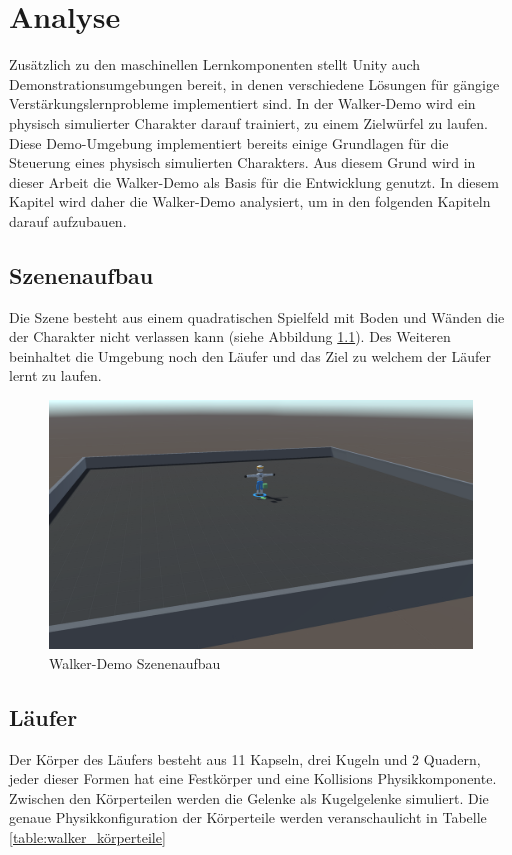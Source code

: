 {\chapter{Analyse}}
\label{sec:analyse}
Zusätzlich zu den maschinellen Lernkomponenten stellt Unity auch Demonstrationsumgebungen bereit, in denen verschiedene Lösungen für gängige Verstärkungslernprobleme implementiert sind. In der Walker-Demo wird ein physisch simulierter Charakter darauf trainiert, zu einem Zielwürfel zu laufen. Diese Demo-Umgebung implementiert bereits einige Grundlagen für die Steuerung eines physisch simulierten Charakters. Aus diesem Grund wird in dieser Arbeit die Walker-Demo als Basis für die Entwicklung genutzt. In diesem Kapitel wird daher die Walker-Demo analysiert, um in den folgenden Kapiteln darauf aufzubauen.

\section{Szenenaufbau}
Die Szene besteht aus einem quadratischen Spielfeld mit Boden und Wänden die der Charakter nicht verlassen kann (siehe Abbildung \ref{fig:walker_aufbau}). Des Weiteren beinhaltet die Umgebung noch den Läufer und das Ziel zu welchem der Läufer lernt zu laufen.
\begin{figure}[H]
  \centering  
  \includegraphics[scale=0.35]{img/walker_aufbau.png}
  \caption{Walker-Demo Szenenaufbau}
  \label{fig:walker_aufbau}
\end{figure}

\section{Läufer}
Der Körper des Läufers besteht aus 11 Kapseln, drei Kugeln und 2 Quadern, jeder dieser Formen hat eine Festkörper und eine Kollisions Physikkomponente. Zwischen den Körperteilen werden die Gelenke als Kugelgelenke simuliert. Die genaue Physikkonfiguration der Körperteile werden veranschaulicht in Tabelle \ref{table:walker_körperteile}

